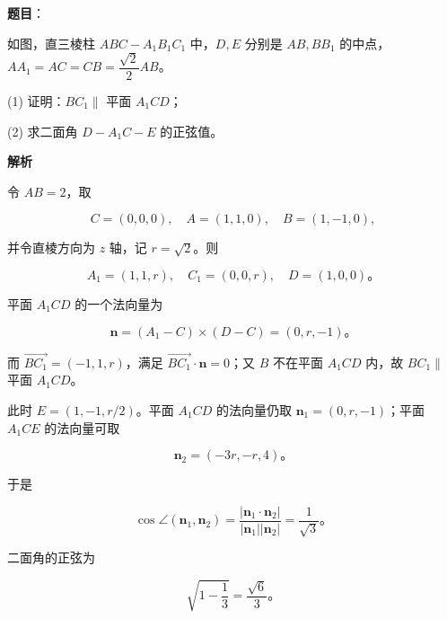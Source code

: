 \begin{answer}

\textbf{题目}：

如图，直三棱柱 $ABC-A_1B_1C_1$ 中，$D,E$ 分别是 $AB,BB_1$ 的中点，$AA_1=AC=CB=\dfrac{\sqrt2}{2}AB$。
\nopagebreak[4]
\begin{center}\end{center}
\nopagebreak[4]
(1) 证明：$BC_1\parallel$ 平面 $A_1CD$；

(2) 求二面角 $D-A_1C-E$ 的正弦值。

\textbf{解析}


令 $AB=2$，取

\nopagebreak[4]
\[C=(0,0,0),\quad A=(1,1,0),\quad B=(1,-1,0),\]

并令直棱方向为 $z$ 轴，记 $r=\sqrt2$。则

\nopagebreak[4]
\[A_1=(1,1,r),\quad C_1=(0,0,r),\quad D=(1,0,0)\text{。}\]

平面 $A_1CD$ 的一个法向量为

\nopagebreak[4]
\[\boldsymbol n=(A_1-C)\times(D-C)=(0,r,-1)\text{。}\]

而 $\overrightarrow{BC_1}=(-1,1,r)$，满足 $\overrightarrow{BC_1}\cdot\boldsymbol n=0$；又 $B$ 不在平面 $A_1CD$ 内，故 $BC_1\parallel$ 平面 $A_1CD$。


此时 $E=(1,-1,r/2)$。平面 $A_1CD$ 的法向量仍取 $\boldsymbol n_1=(0,r,-1)$；平面 $A_1CE$ 的法向量可取

\nopagebreak[4]
\[\boldsymbol n_2=(-3r,-r,4)\text{。}\]

于是

\nopagebreak[4]
\[\cos\angle(\boldsymbol n_1,\boldsymbol n_2)=\frac{|\boldsymbol n_1\cdot\boldsymbol n_2|}{|\boldsymbol n_1||\boldsymbol n_2|}=\frac1{\sqrt3}\text{。}\]

二面角的正弦为

\nopagebreak[4]
\[\sqrt{1-\frac13}=\frac{\sqrt6}{3}\text{。}\]



\end{answer}
